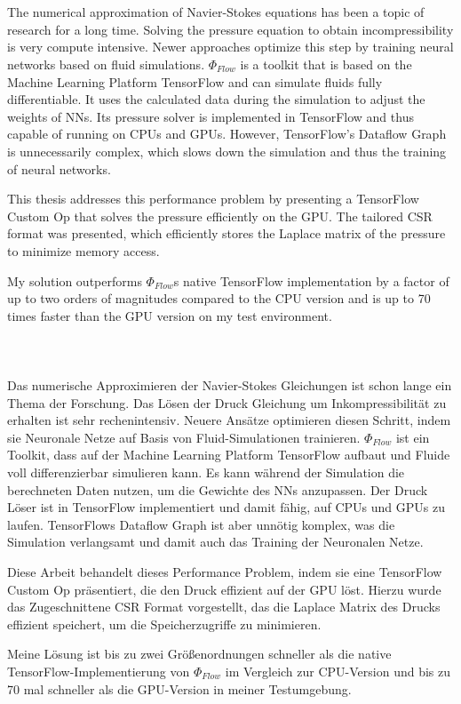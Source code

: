 \chapter{\abstractname}
\small
The numerical approximation of Navier-Stokes equations has been a topic of research for a long time. Solving the pressure equation to obtain incompressibility is very compute intensive. Newer approaches optimize this step by training neural networks based on fluid simulations. $\Phi_{Flow}$ is a toolkit that is based on the Machine Learning Platform TensorFlow and can simulate fluids fully differentiable. It uses the calculated data during the simulation to adjust the weights of NNs. Its pressure solver is implemented in TensorFlow and thus capable of running on CPUs and GPUs. However, TensorFlow's Dataflow Graph is unnecessarily complex, which slows down the simulation and thus the training of neural networks. 
\par This thesis addresses this performance problem by presenting a TensorFlow Custom Op that solves the pressure efficiently on the GPU. The tailored CSR format was presented, which efficiently stores the Laplace matrix of the pressure to minimize memory access. 
\par My solution outperforms $\Phi_{Flow}$s native TensorFlow implementation by a factor of up to two orders of magnitudes compared to the CPU version and is up to 70 times faster than the GPU version on my test environment.\\\\\\\\
Das numerische Approximieren der Navier-Stokes Gleichungen ist schon lange ein Thema der Forschung. Das Lösen der Druck Gleichung um Inkompressibilität zu erhalten ist sehr rechenintensiv. Neuere Ansätze optimieren diesen Schritt, indem sie Neuronale Netze auf Basis von Fluid-Simulationen trainieren. $\Phi_{Flow}$ ist ein Toolkit, dass auf der Machine Learning Platform TensorFlow aufbaut und Fluide voll differenzierbar simulieren kann. Es kann während der Simulation die berechneten Daten nutzen, um die Gewichte des NNs anzupassen. Der Druck Löser ist in TensorFlow implementiert und damit fähig, auf CPUs und GPUs zu laufen. TensorFlows Dataflow Graph ist aber unnötig komplex, was die Simulation verlangsamt und damit auch das Training der Neuronalen Netze. 
\par Diese Arbeit behandelt dieses Performance Problem, indem sie eine TensorFlow Custom Op präsentiert, die den Druck effizient auf der GPU löst. Hierzu wurde das Zugeschnittene CSR Format vorgestellt, das die Laplace Matrix des Drucks effizient speichert, um die Speicherzugriffe zu minimieren. 
\par Meine Lösung ist bis zu zwei Größenordnungen schneller als die native TensorFlow-Implementierung von $\Phi_{Flow}$ im Vergleich zur CPU-Version und bis zu 70 mal schneller als die GPU-Version in meiner Testumgebung.

\normalsize